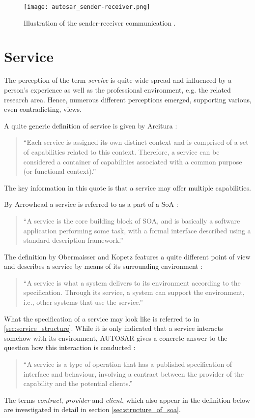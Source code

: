 \begin{figure}[!htbp]
\centering
\texttt{[image: autosar\_sender-receiver.png]}
\caption{Illustration of the sender-receiver communication \cite{autosar_intro}.}
\label{fig:autosar_sender-receiver}
\end{figure}




\section{Service}
\label{ch:service} 
The perception of the term \emph{service} is quite wide spread and influenced by a person's experience as well as the professional environment, e.g. the related research area. Hence, numerous different perceptions emerged, supporting various, even contradicting, views.

A quite generic definition of service is given by Arcitura \cite{arcitura}:
\begin{quote}
``Each service is assigned its own distinct context and is comprised of a set of capabilities related to this context. Therefore, a service can be considered a container of capabilities associated with a common purpose (or functional context).''
\end{quote}
The key information in this quote is that a service may offer multiple capabilities.

By Arrowhead a service is referred to as a part of a SoA \cite{arrowhead}:
\begin{quote}
``A service is the core building block of SOA, and is basically a software application performing some task, with a formal interface described using a standard description framework.''
\end{quote}

The definition by Obermaisser and Kopetz features a quite different point of view and describes a service by means of its surrounding environment \cite[p.8]{genesys}:
\begin{quote}
``A service is what a system delivers to its environment according to the specification. Through its service, a system can support the environment, i.e., other systems that use the service.''
\end{quote}
What the specification of a service may look like is referred to in \ref{sec:service_structure}. While it is only indicated that a service interacts somehow with its environment, \mbox{AUTOSAR} gives a concrete answer to the question how this interaction is conducted \cite{autosar_glossary}:
\begin{quote}
``A service is a type of operation that has a published specification of interface and behaviour, involving a contract between the provider of the capability and the potential clients.''
\end{quote}
The terms \emph{contract}, \emph{provider} and \emph{client}, which also appear in the definition below are investigated in detail in section \ref{sec:structure_of_soa}.

